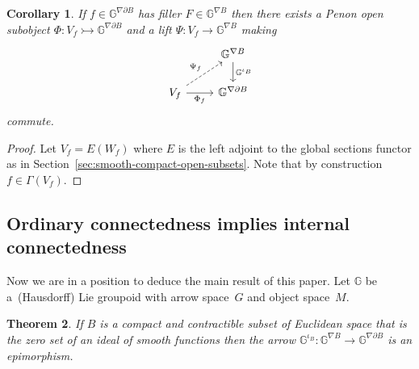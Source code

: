 \documentclass[10pt,a4paper]{amsart}
\numberwithin{equation}{section}
\newtheorem{Theorem}{Theorem}[section]
\newtheorem{Corollary}[Theorem]{Corollary}
\begin{document}
\begin{Corollary}\label{main-lemma}
If $f\in \mathbb{G}^{\nabla\partial B}$ has filler $F\in \mathbb{G}^{\nabla B}$ then there exists a Penon open subobject $\Phi\colon V_f\rightarrowtail \mathbb{G}^{\nabla\partial B}$ and a lift $\Psi\colon V_f\rightarrow \mathbb{G}^{\nabla B}$ making
\begin{equation*}\begin{tikzcd}
& \mathbb{G}^{\nabla B} \dar{\mathbb{G}^{\iota_B}} \\
V_f \rar[swap]{\Phi_f} \urar[dashed]{\Psi_f} & \mathbb{G}^{\nabla\partial B}
\end{tikzcd}\end{equation*}
 commute.
\end{Corollary}
\begin{proof}Let $V_f=E(W_f)$ where $E$ is the left adjoint to the global sections functor as in Section~\ref{sec:smooth-compact-open-subsets}. Note that by construction $f\in \Gamma(V_f)$.
\end{proof}

\subsection{Ordinary connectedness implies internal connectedness}\label{sec:ordinary-connectedness-implies-enriched}

Now we are in a position to deduce the main result of this paper. Let $\mathbb{G}$ be a~(Hausdorf\/f) Lie groupoid with arrow space~$G$ and object space~$M$.

\begin{Theorem} If $B$ is a compact and contractible subset of Euclidean space that is the zero set of an ideal of smooth functions then the arrow $\mathbb{G}^{\iota_B}\colon \mathbb{G}^{\nabla B} \rightarrow \mathbb{G}^{\nabla\partial B}$ is an epimorphism.
\end{Theorem}
\end{document}
